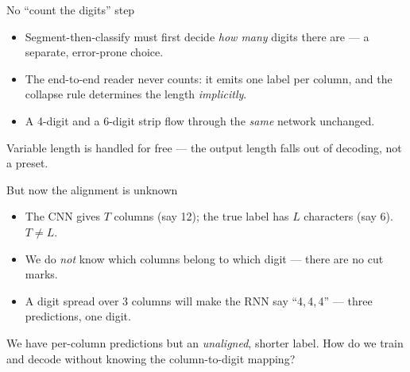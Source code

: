 \documentclass[10pt,aspectratio=169]{beamer}
\begin{document}
\begin{frame}{No ``count the digits'' step}
  \begin{itemize}
    \item Segment-then-classify must first decide \emph{how many} digits there are --- a separate, error-prone choice.
    \item The end-to-end reader never counts: it emits one label per column, and the collapse rule
          determines the length \emph{implicitly}.
    \item A 4-digit and a 6-digit strip flow through the \emph{same} network unchanged.
  \end{itemize}
  \begin{goodbox}
    Variable length is handled for free --- the output length falls out of decoding, not a preset.
  \end{goodbox}
\end{frame}

\begin{frame}{But now the alignment is unknown}
  \begin{itemize}
    \item The CNN gives $T$ columns (say 12); the true label has $L$ characters (say 6). $T \neq L$.
    \item We do \emph{not} know which columns belong to which digit --- there are no cut marks.
    \item A digit spread over 3 columns will make the RNN say ``4,\,4,\,4'' --- three predictions, one digit.
  \end{itemize}
  \begin{badbox}
    We have per-column predictions but an \emph{unaligned}, shorter label. How do we train and decode
    without knowing the column-to-digit mapping?
  \end{badbox}
\end{frame}
\end{document}
